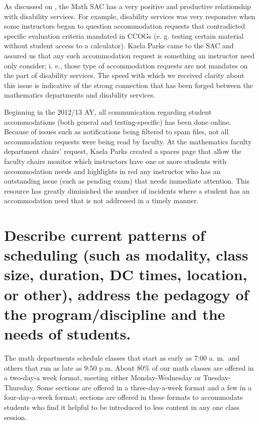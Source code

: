 
As discussed on , the Math SAC has a very positive and productive relationship with disability services.
For example, disability services was very responsive when some instructors began to question accommodation requests that contradicted specific evaluation criteria mandated in CCOGs (e.
g. testing certain material without
student access to a calculator).
Kaela Parks came to the SAC and assured us that any such accommodation request is something an instructor need only consider; i.
e., those type of accommodation requests are not mandates on the
part of disability services.
The speed with which we received clarity about this issue is indicative of the strong connection that has been forged between the mathematics departments and disability services.

Beginning in the 2012/13 AY, all communication regarding student accommodations (both general and testing-specific) has been done online.
Because of issues such as notifications being filtered to spam files, not all accommodation requests were being read by faculty.
At the  mathematics faculty department chairs' request, Kaela Parks created a spaces page that allow the faculty chairs monitor which instructors have one or more students with accommodation needs and highlights in red any instructor who has an outstanding issue (such as pending exam) that needs immediate attention.
This resource has greatly diminished the number of incidents where a student has an accommodation need that is not addressed in a timely manner.

\section[Patterns of scheduling]{Describe current patterns of scheduling (such
  as modality, class size, duration, DC times, location, or other), address the
  pedagogy of the program/discipline and the needs of students.}
\label{facilities:sec:scheduling}
The math departments schedule classes that start as early as 7:00 {\sc a.
m.}\ and
others that run as late as 9:50 {\sc p.m.}
About 80\% of our math classes are offered in a two-day-a week format, meeting either Monday-Wednesday or Tuesday-Thursday.
Some sections are offered in a three-day-a-week format and a few in a four-day-a-week format; sections are offered in these formats to accommodate students who find it helpful to be introduced to less content in any one class session.


